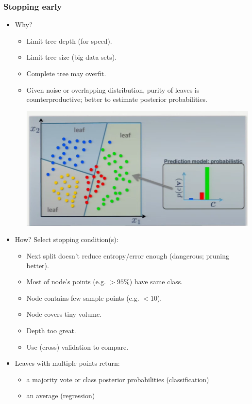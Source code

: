 \documentclass[10pt]{article}
\begin{document}
\subsubsection*{Stopping early}
	\begin{itemize}
		\item Why?
		\begin{itemize}
			\item Limit tree depth (for speed).
			\item Limit tree size (big data sets).
			\item Complete tree may overfit.
			\item Given noise or overlapping distribution, purity of leaves is counterproductive; better to estimate posterior probabilities.
			\begin{center}
				\includegraphics[scale=0.5]{../images/probablitiestree}
			\end{center}
		\end{itemize}
		\item How? Select stopping condition(s):
		\begin{itemize}
			\item Next split doesn't reduce entropy/error enough (dangerous; pruning better).
			\item Most of node's points (e.g. $> 95\%$) have same class.
			\item Node contains few sample points (e.g. $< 10$).
			\item Node covers tiny volume.
			\item Depth too great.
			\item Use (cross)-validation to compare.
		\end{itemize}
		\item Leaves with multiple points return:
		\begin{itemize}
			\item a majority vote or class posterior probabilities (classification)
			\item an average (regression)
		\end{itemize}
	\end{itemize}
	
\end{document}
